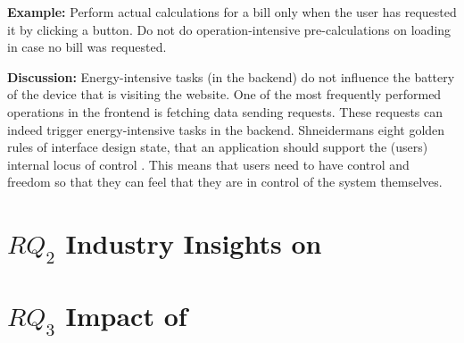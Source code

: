 \textbf{Example:} Perform actual calculations for a bill only when the user has requested it by clicking a button. Do not do operation-intensive pre-calculations on loading in case no bill was requested.



\textbf{Discussion:} Energy-intensive tasks (in the backend) do not influence the battery of the device that is visiting the website. One of the most frequently performed operations in the frontend is fetching data \ie sending requests. These requests can indeed trigger energy-intensive tasks in the backend. Shneidermans eight golden rules of interface design state, that an application should support the (users) internal locus of control \cite{shneidermans-eight-golden-rules}. This means that users need to have control and freedom so that they can feel that they are in control of the system themselves.



\section{\texorpdfstring{$RQ_2$}: Industry Insights on \EPS} 


\section{\texorpdfstring{$RQ_3$}: Impact of \EPS} 






